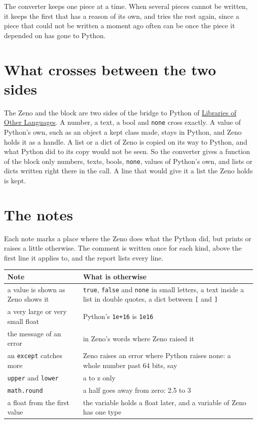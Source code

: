 The converter keeps one piece at a time. When several pieces cannot be
written, it keeps the first that has a reason of its own, and tries
the rest again, since a piece that could not be written a moment ago
often can be once the piece it depended on has gone to Python.

\section{What crosses between the two sides}

The Zeno and the block are two sides of the bridge to Python of
\hyperref[ch-other-languages]{Libraries of Other Languages}. A number, a
text, a bool and \verb|none| cross exactly. A value of Python's own,
such as an object a kept class made, stays in Python, and Zeno holds
it as a handle. A list or a dict of Zeno is copied on its way to
Python, and what Python did to its copy would not be seen. So the
converter gives a function of the block only numbers, texts, bools,
\verb|none|, values of Python's own, and lists or dicts written right
there in the call. A line that would give it a list the Zeno holds is
kept.

\section{The notes}

Each note marks a place where the Zeno does what the Python did, but
prints or raises a little otherwise. The comment is written once for
each kind, above the first line it applies to, and the report lists
every line.

\begin{center}
\begin{tabular}{P{4.6cm}P{7.2cm}}
\toprule
Note & What is otherwise \\
\midrule
a value is shown as Zeno shows it & \verb|true|, \verb|false| and
  \verb|none| in small letters, a text inside a list in double quotes,
  a dict between \verb|[| and \verb|]| \\
a very large or very small float & Python's \verb|1e+16| is
  \verb|1e16| \\
the message of an error & in Zeno's words where Zeno raised it \\
an \verb|except| catches more & Zeno raises an error where Python
  raises none: a whole number past 64 bits, say \\
\verb|upper| and \verb|lower| & a to z only \\
\verb|math.round| & a half goes away from zero: 2.5 to 3 \\
a float from the first value & the variable holds a float later, and
  a variable of Zeno has one type \\
\bottomrule
\end{tabular}
\end{center}

